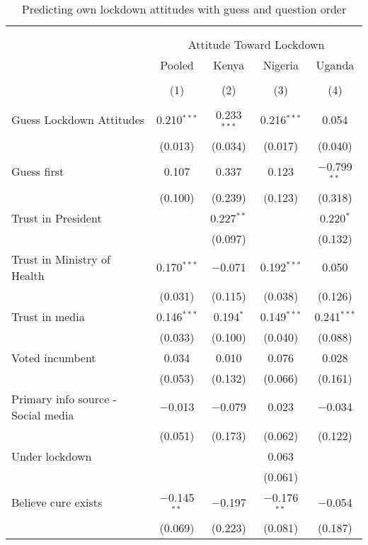 
\begin{table}[!htbp] \centering 
  \caption{Predicting own lockdown attitudes with guess and question order} 
  \label{si:pred_att_lock_full} 
\scriptsize 
\begin{tabular}{@{\extracolsep{5pt}}lcccc} 
\\[-1.8ex]\hline 
\hline \\[-1.8ex] 
\\[-1.8ex] & \multicolumn{4}{c}{Attitude Toward Lockdown} \\ 
 & Pooled & Kenya & Nigeria & Uganda \\ 
\\[-1.8ex] & (1) & (2) & (3) & (4)\\ 
\hline \\[-1.8ex] 
 Guess Lockdown Attitudes & 0.210$^{***}$ & 0.233$^{***}$ & 0.216$^{***}$ & 0.054 \\ 
  & (0.013) & (0.034) & (0.017) & (0.040) \\ 
  Guess first & 0.107 & 0.337 & 0.123 & $-$0.799$^{**}$ \\ 
  & (0.100) & (0.239) & (0.123) & (0.318) \\ 
  Trust in President &  & 0.227$^{**}$ &  & 0.220$^{*}$ \\ 
  &  & (0.097) &  & (0.132) \\ 
  Trust in Ministry of Health & 0.170$^{***}$ & $-$0.071 & 0.192$^{***}$ & 0.050 \\ 
  & (0.031) & (0.115) & (0.038) & (0.126) \\ 
  Trust in media & 0.146$^{***}$ & 0.194$^{*}$ & 0.149$^{***}$ & 0.241$^{***}$ \\ 
  & (0.033) & (0.100) & (0.040) & (0.088) \\ 
  Voted incumbent & 0.034 & 0.010 & 0.076 & 0.028 \\ 
  & (0.053) & (0.132) & (0.066) & (0.161) \\ 
  Primary info source - Social media & $-$0.013 & $-$0.079 & 0.023 & $-$0.034 \\ 
  & (0.051) & (0.173) & (0.062) & (0.122) \\ 
  Under lockdown &  &  & 0.063 &  \\ 
  &  &  & (0.061) &  \\ 
  Believe cure exists & $-$0.145$^{**}$ & $-$0.197 & $-$0.176$^{**}$ & $-$0.054 \\ 
  & (0.069) & (0.223) & (0.081) & (0.187) \\ 

\end{tabular}
\end{table}
